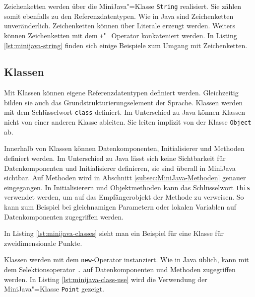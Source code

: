 Zeichenketten werden über die MiniJava"=Klasse \lstinline{String} realisiert. Sie zählen somit ebenfalls zu den Referenzdatentypen. Wie in Java sind Zeichenketten unveränderlich. Zeichenketten können über Literale erzeugt werden. Weiters können Zeichenketten mit dem \lstinline{+}"=Operator konkateniert werden. In Listing \ref{lst:minijava-string} finden sich einige Beispiele zum Umgang mit Zeichenketten.



\subsection{Klassen}
\label{subsec:MiniJava-Klassen}

Mit Klassen können eigene Referenzdatentypen definiert werden. Gleichzeitig bilden sie auch das Grundstrukturierungselement der Sprache. Klassen werden mit dem Schlüsselwort \lstinline{class} definiert. Im Unterschied zu Java können Klassen nicht von einer anderen Klasse ableiten. Sie leiten implizit von der Klasse \lstinline{Object} ab.

Innerhalb von Klassen können Datenkomponenten, Initialisierer und Methoden definiert werden. Im Unterschied zu Java lässt sich keine Sichtbarkeit für Datenkomponenten und Initialisierer definieren, sie sind überall in MiniJava sichtbar. Auf Methoden wird in Abschnitt \ref{subsec:MiniJava-Methoden} genauer eingegangen. In Initialisierern und Objektmethoden kann das Schlüsselwort \lstinline{this} verwendet werden, um auf das Empfängerobjekt der Methode zu verweisen. So kann zum Beispiel bei gleichnamigen Parametern oder lokalen Variablen auf Datenkomponenten zugegriffen werden.

In Listing \ref{lst:minijava-classes} sieht man ein Beispiel für eine Klasse für zweidimensionale Punkte.



Klassen werden mit dem \lstinline{new}-Operator instanziert. Wie in Java üblich, kann mit dem Selektionsoperator \lstinline{.} auf Datenkomponenten und Methoden zugegriffen werden. In Listing \ref{lst:minijava-class-use} wird die Verwendung der MiniJava"=Klasse \lstinline{Point} gezeigt.



